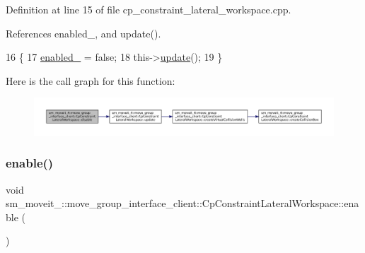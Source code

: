 Definition at line 15 of file cp\+\_\+constraint\+\_\+lateral\+\_\+workspace.\+cpp.



References enabled\+\_\+, and update().


\begin{DoxyCode}
16         \{
17             \hyperlink{classsm__moveit__4_1_1move__group__interface__client_1_1CpConstraintLateralWorkspace_a7981810bd40955300bb7ba724361d4d7}{enabled\_} = \textcolor{keyword}{false};
18             this->\hyperlink{classsm__moveit__4_1_1move__group__interface__client_1_1CpConstraintLateralWorkspace_a2f4341da0a276e9d9f792f61ef18528c}{update}();
19         \}
\end{DoxyCode}
Here is the call graph for this function\+:
\nopagebreak
\begin{figure}[H]
\begin{center}
\leavevmode
\includegraphics[width=350pt]{classsm__moveit__4_1_1move__group__interface__client_1_1CpConstraintLateralWorkspace_a2e14acb1788f7592882e246ad093a360_cgraph}
\end{center}
\end{figure}
\mbox{\label{classsm__moveit__4_1_1move__group__interface__client_1_1CpConstraintLateralWorkspace_a312f640353ff4402561faee61f7b5d18}} 
\subsubsection{\texorpdfstring{enable()}{enable()}}
{\footnotesize\ttfamily void sm\+\_\+moveit\+\_\+::move\+\_\+group\+\_\+interface\+\_\+client\+::\+Cp\+Constraint\+Lateral\+Workspace\+::enable (\begin{DoxyParamCaption}{ }\end{DoxyParamCaption})}



